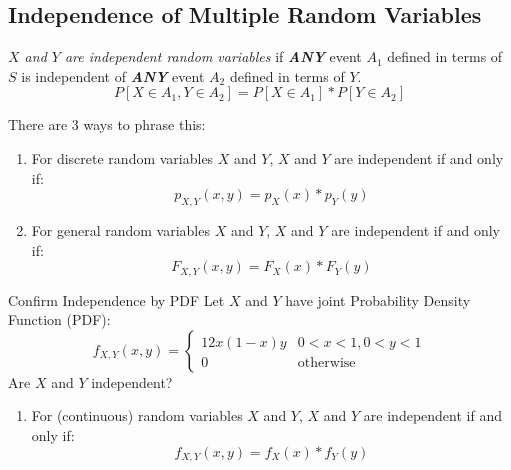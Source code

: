 \subsection{Independence of Multiple Random Variables}\label{subsec:Independence of Multiple Random Variables}
\begin{definition}\label{def:Independence of Multiple Random Variables}
  \emph{$X$ and $Y$ are independent random variables} if \emph{\textbf{ANY}} event $A_{1}$ defined in terms of $S$ is independent of \emph{\textbf{ANY}} event $A_{2}$ defined in terms of $Y$.
  \begin{equation}\label{eq:Independence of Multiple Random Variables}
    P \left[ X \in A_{1}, Y \in A_{2} \right] = P \left[ X \in A_{1} \right] * P \left[ Y \in A_{2} \right]
  \end{equation}
\end{definition}
There are 3 ways to phrase this:
\begin{enumerate}
\item For discrete random variables $X$ and $Y$, $X$ and $Y$ are independent if and only if:
  \begin{equation}\label{eq:Independence of Multiple Discrete Random Variables Using PMF}
    p_{X,Y} \left( x,y \right) = p_{X} \left( x \right) * p_{Y} \left( y \right)
  \end{equation}

\item For general random variables $X$ and $Y$, $X$ and $Y$ are independent if and only if:
  \begin{equation}\label{eq:Independence of Multiple General Random Variables Using CDF}
    F_{X,Y} \left( x,y \right) = F_{X} \left( x \right) * F_{Y} \left( y \right)
  \end{equation}
\end{enumerate}
\begin{example}{Confirm Independence by PDF}
  Let $X$ and $Y$ have joint Probability Density Function (PDF):
  \begin{equation*}
    f_{X,Y} \left( x,y \right) = \begin{cases}
      12x \left( 1-x \right)y & 0 < x < 1, 0 < y < 1 \\
      0 & \text{otherwise}
    \end{cases}
  \end{equation*}
  Are $X$ and $Y$ independent?
\end{example}
\begin{enumerate}[resume]
\item For (continuous) random variables $X$ and $Y$, $X$ and $Y$ are independent if and only if:
  \begin{equation}\label{eq:Independence of Multiple Continuous Random Variables Using PDF}
    f_{X,Y} \left( x,y \right) = f_{X} \left( x \right) * f_{Y} \left( y \right)
  \end{equation}
\end{enumerate}
